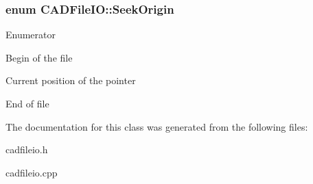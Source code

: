 \subsubsection[{\texorpdfstring{Seek\+Origin}{SeekOrigin}}]{\setlength{\rightskip}{0pt plus 5cm}enum {\bf C\+A\+D\+File\+I\+O\+::\+Seek\+Origin}\hspace{0.3cm}{\ttfamily [strong]}}\hypertarget{class_c_a_d_file_i_o_ac02f709414ed2d228f8dfdabb4eb1b4f}{}\label{class_c_a_d_file_i_o_ac02f709414ed2d228f8dfdabb4eb1b4f}
\begin{Desc}
\item[Enumerator]\par
\begin{description}
\item[{\em 
B\+EG\hypertarget{class_c_a_d_file_i_o_ac02f709414ed2d228f8dfdabb4eb1b4facdf5cd8617366687b19657108513b589}{}\label{class_c_a_d_file_i_o_ac02f709414ed2d228f8dfdabb4eb1b4facdf5cd8617366687b19657108513b589}
}]Begin of the file \item[{\em 
C\+UR\hypertarget{class_c_a_d_file_i_o_ac02f709414ed2d228f8dfdabb4eb1b4faf32924c53f864144ab34d1f7c12a0d4a}{}\label{class_c_a_d_file_i_o_ac02f709414ed2d228f8dfdabb4eb1b4faf32924c53f864144ab34d1f7c12a0d4a}
}]Current position of the pointer \item[{\em 
E\+ND\hypertarget{class_c_a_d_file_i_o_ac02f709414ed2d228f8dfdabb4eb1b4fab1a326c06d88bf042f73d70f50197905}{}\label{class_c_a_d_file_i_o_ac02f709414ed2d228f8dfdabb4eb1b4fab1a326c06d88bf042f73d70f50197905}
}]End of file \end{description}
\end{Desc}


The documentation for this class was generated from the following files\+:\begin{DoxyCompactItemize}
\item 
cadfileio.\+h\item 
cadfileio.\+cpp\end{DoxyCompactItemize}
